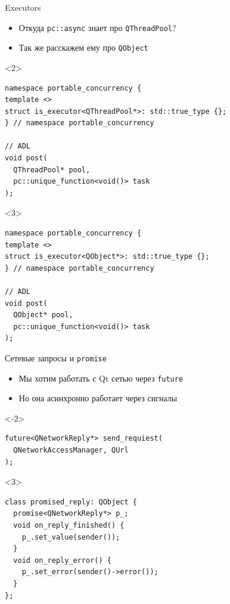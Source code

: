 \documentclass[aspectratio=169,pdf,hyperref={unicode},14pt]{beamer}
\begin{document}
\begin{frame}[fragile,t]{Executors}
 \begin{itemize}
  \item<1-> Откуда \texttt{pc::async} знает про \texttt{QThreadPool}?
  \item<3> Так же расскажем ему про \texttt{QObject}
 \end{itemize}
 \begin{onlyenv}<2>
  \begin{lstlisting}[style=cppcode]
namespace portable_concurrency {
template <>
struct is_executor<QThreadPool*>: std::true_type {};
} // namespace portable_concurrency

// ADL
void post(
  QThreadPool* pool,
  pc::unique_function<void()> task
);
  \end{lstlisting}
 \end{onlyenv}
 \begin{onlyenv}<3>
  \begin{lstlisting}[style=cppcode]
namespace portable_concurrency {
template <>
struct is_executor<QObject*>: std::true_type {};
} // namespace portable_concurrency

// ADL
void post(
  QObject* pool,
  pc::unique_function<void()> task
);
  \end{lstlisting}
 \end{onlyenv}
\end{frame}

\begin{frame}[fragile,t]{Сетевые запросы и \texttt{promise}}
 \begin{itemize}[<+->]
  \item Мы хотим работать с Qt сетью через \texttt{future}
  \item Но она асинхронно работает через сигналы
 \end{itemize}

 \begin{onlyenv}<-2>
 \begin{lstlisting}[style=cppcode]
future<QNetworkReply*> send_requiest(
  QNetworkAccessManager, QUrl
);
 \end{lstlisting}
 \end{onlyenv}
 \begin{onlyenv}<3>
 \begin{lstlisting}[style=cppcode]
class promised_reply: QObject {
  promise<QNetworkReply*> p_;
  void on_reply_finished() {
    p_.set_value(sender());
  }
  void on_reply_error() {
    p_.set_error(sender()->error());
  }
};
 \end{lstlisting}
 \end{onlyenv}
\end{frame}
\end{document}
